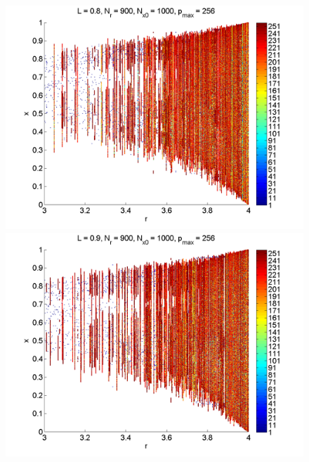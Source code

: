 \begin{figure}[H]
\begin{center}
		\includegraphics[width=.5\textwidth]{figs/rlog_bif_zoom_L_08.png}\hfill
		\includegraphics[width=.5\textwidth]{figs/rlog_bif_zoom_L_09.png}\\
	\end{center}
\end{figure}
